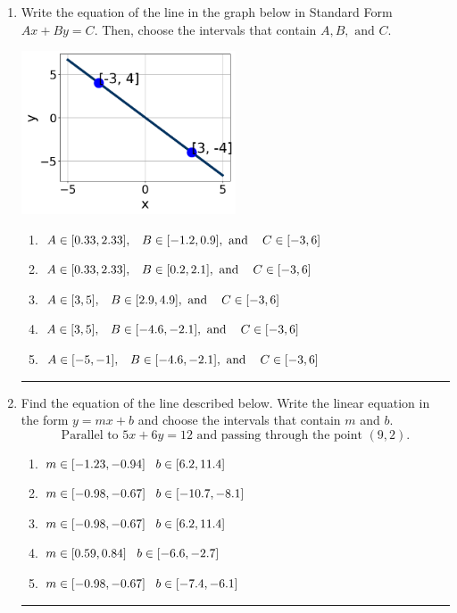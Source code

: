\documentclass[14pt]{extbook}
\newcommand{\litem}[1]{\item#1\hspace*{-1cm}\rule{\textwidth}{0.4pt}}
\begin{document}
\begin{enumerate}
{\begin{enumerate}[label=\Alph*.]
\end{enumerate} }
\litem{
Write the equation of the line in the graph below in Standard Form $Ax+By=C$. Then, choose the intervals that contain $A, B, \text{ and } C$.
\begin{center}
    \includegraphics[width=0.5\textwidth]{../Figures/linearGraphToStandardCopyC.png}
\end{center}
\begin{enumerate}[label=\Alph*.]
\item \( A \in [0.33, 2.33], \hspace{3mm} B \in [-1.2, 0.9], \text{ and } \hspace{3mm} C \in [-3, 6] \)
\item \( A \in [0.33, 2.33], \hspace{3mm} B \in [0.2, 2.1], \text{ and } \hspace{3mm} C \in [-3, 6] \)
\item \( A \in [3, 5], \hspace{3mm} B \in [2.9, 4.9], \text{ and } \hspace{3mm} C \in [-3, 6] \)
\item \( A \in [3, 5], \hspace{3mm} B \in [-4.6, -2.1], \text{ and } \hspace{3mm} C \in [-3, 6] \)
\item \( A \in [-5, -1], \hspace{3mm} B \in [-4.6, -2.1], \text{ and } \hspace{3mm} C \in [-3, 6] \)

\end{enumerate} }
\litem{
Find the equation of the line described below. Write the linear equation in the form $ y=mx+b $ and choose the intervals that contain $m$ and $b$.\[ \text{Parallel to } 5 x + 6 y = 12 \text{ and passing through the point } (9, 2). \]\begin{enumerate}[label=\Alph*.]
\item \( m \in [-1.23, -0.94] \hspace*{3mm} b \in [6.2, 11.4] \)
\item \( m \in [-0.98, -0.67] \hspace*{3mm} b \in [-10.7, -8.1] \)
\item \( m \in [-0.98, -0.67] \hspace*{3mm} b \in [6.2, 11.4] \)
\item \( m \in [0.59, 0.84] \hspace*{3mm} b \in [-6.6, -2.7] \)
\item \( m \in [-0.98, -0.67] \hspace*{3mm} b \in [-7.4, -6.1] \)


\end{enumerate}}
\end{enumerate}
\end{document}

